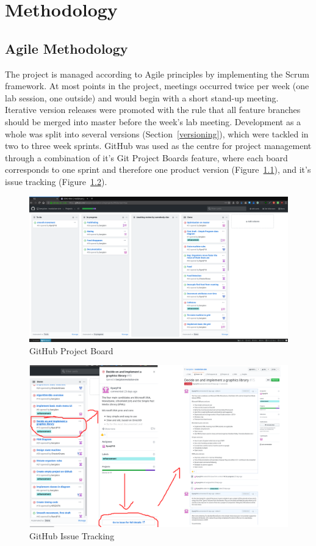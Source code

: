 \documentclass[a4paper, oneside, 11pt]{report}
\begin{document}
\chapter{Methodology}\label{methodology}

\section{Agile Methodology}\label{projectmanagement}
The project is managed according to Agile principles by implementing the Scrum framework. At most points in the project, meetings occurred twice per week (one lab session, one outside) and would begin with a short stand-up meeting. Iterative version releases were promoted with the rule that all feature branches should be merged into master before the week's lab meeting. Development as a whole was split into several versions (Section~\ref{versioning}), which were tackled in two to three week sprints. GitHub was used as the centre for project management through a combination of it's Git Project Boards feature, where each board corresponds to one sprint and therefore one product version (Figure~\ref{gitboard}), and it's issue tracking (Figure~\ref{gitissue}). 

\begin{figure}[H]
	\caption{GitHub Project Board}\label{gitboard}
	\centering
	\includegraphics[width=1\textwidth]{gitproj}
\end{figure}

\begin{figure}[H]
	\caption{GitHub Issue Tracking}\label{gitissue}
	\centering
	\includegraphics[width=1\textwidth]{gitissuetrack}
\end{figure}
\end{document}
